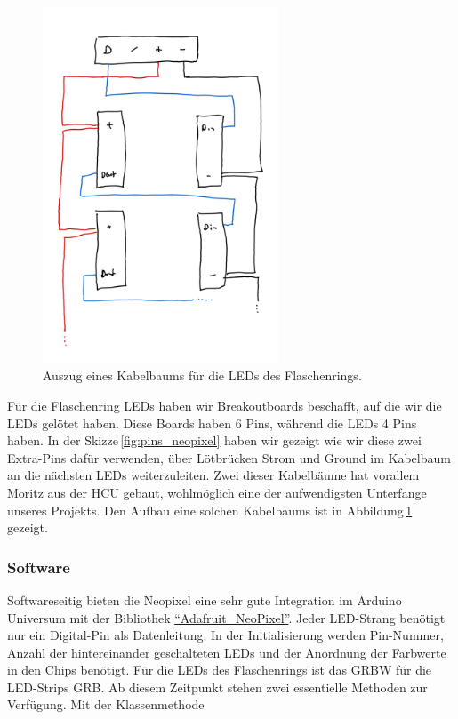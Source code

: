             \begin{figure}[H]
                \begin{center}
                    \includegraphics[width=7cm]{media/03_technical_implementation/leds_1.png}
                \end{center}
                \caption{Auszug eines Kabelbaums für die LEDs des Flaschenrings.}
                \label{fig:led_wiring_1}
            \end{figure}
      
            Für die Flaschenring LEDs haben wir Breakoutboards beschafft, auf die wir die LEDs gelötet haben. Diese Boards haben 6 Pins, während die LEDs 4 Pins haben. In der Skizze\,\ref{fig:pins_neopixel} haben wir gezeigt wie wir diese zwei Extra-Pins dafür verwenden, über Lötbrücken Strom und Ground im Kabelbaum an die nächsten LEDs weiterzuleiten. Zwei dieser Kabelbäume hat vorallem Moritz aus der HCU gebaut, wohlmöglich eine der aufwendigsten Unterfange unseres Projekts. Den Aufbau eine solchen Kabelbaums ist in Abbildung\,\ref{fig:led_wiring_1} gezeigt.


            
        \subsubsection{Software}

            Softwareseitig bieten die Neopixel eine sehr gute Integration im Arduino Universum mit der Bibliothek \href{https://github.com/adafruit/Adafruit_NeoPixel}{\enquote{Adafruit\_NeoPixel}}.
            Jeder LED-Strang benötigt nur ein Digital-Pin als Datenleitung.
            In der Initialisierung werden Pin-Nummer, Anzahl der hintereinander geschalteten LEDs und der Anordnung der Farbwerte in den Chips benötigt. Für die LEDs des Flaschenrings ist das GRBW für die LED-Strips GRB.
            Ab diesem Zeitpunkt stehen zwei essentielle Methoden zur Verfügung.
            Mit der Klassenmethode 

